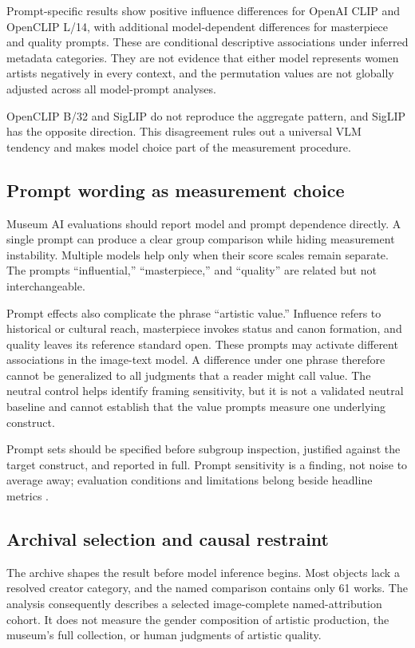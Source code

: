 \documentclass[pdflatex,sn-basic,Numbered]{sn-jnl}
\begin{document}
Prompt-specific results show positive influence differences for OpenAI CLIP and OpenCLIP L/14, with additional model-dependent differences for masterpiece and quality prompts. These are conditional descriptive associations under inferred metadata categories. They are not evidence that either model represents women artists negatively in every context, and the permutation values are not globally adjusted across all model-prompt analyses.

OpenCLIP B/32 and SigLIP do not reproduce the aggregate pattern, and SigLIP has the opposite direction. This disagreement rules out a universal VLM tendency and makes model choice part of the measurement procedure.

\subsection{Prompt wording as measurement choice}

Museum AI evaluations should report model and prompt dependence directly. A single prompt can produce a clear group comparison while hiding measurement instability. Multiple models help only when their score scales remain separate. The prompts ``influential,'' ``masterpiece,'' and ``quality'' are related but not interchangeable.

Prompt effects also complicate the phrase ``artistic value.'' Influence refers to historical or cultural reach, masterpiece invokes status and canon formation, and quality leaves its reference standard open. These prompts may activate different associations in the image-text model. A difference under one phrase therefore cannot be generalized to all judgments that a reader might call value. The neutral control helps identify framing sensitivity, but it is not a validated neutral baseline and cannot establish that the value prompts measure one underlying construct.

Prompt sets should be specified before subgroup inspection, justified against the target construct, and reported in full. Prompt sensitivity is a finding, not noise to average away; evaluation conditions and limitations belong beside headline metrics \cite{mitchell2019model}.

\subsection{Archival selection and causal restraint}

The archive shapes the result before model inference begins. Most objects lack a resolved creator category, and the named comparison contains only 61 works. The analysis consequently describes a selected image-complete named-attribution cohort. It does not measure the gender composition of artistic production, the museum's full collection, or human judgments of artistic quality.
\end{document}
